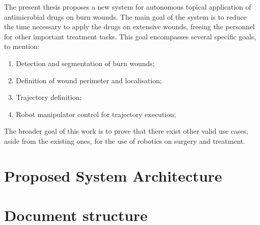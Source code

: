 The present thesis proposes a new system for autonomous topical application of antimicrobial drugs on burn wounds. The main goal of the system is to reduce the time necessary to apply the drugs on extensive wounds, freeing the personnel for other important treatment tasks. This goal encompasses several specific goals, to mention:
\begin{enumerate}
    \item Detection and segmentation of burn wounds;
    \item Definition of wound perimeter and localisation;
    \item Trajectory definition;
    \item Robot manipulator control for trajectory execution;
\end{enumerate}
The broader goal of this work is to prove that there exist other valid use cases, aside from the existing ones, for the use of robotics on surgery and treatment.


\section{Proposed System Architecture} %
\label{sec:proposed_system_architecture}


\section{Document structure}
\label{sec:document_structure}

